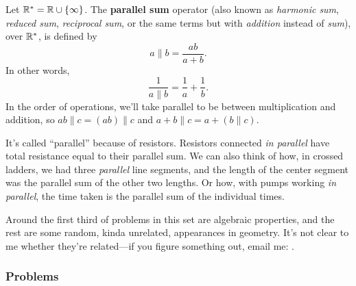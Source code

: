 \documentclass[11pt,paper=letter]{scrartcl}
\newcommand{\pl}{\parallel}
\begin{document}
Let $ \mathbb R^* = \mathbb R \cup \{\infty\} $. The \textbf{parallel sum} operator (also known as \textit{harmonic sum}, \textit{reduced sum}, \textit{reciprocal sum}, or the same terms but with \textit{addition} instead of \textit{sum}), over $\mathbb R^*$, is defined by \[
  a \pl b = \frac{ab}{a + b}.
\]
In other words, \[
  \frac{1}{a \pl b} = \frac{1}{a} + \frac{1}{b}.
\]
In the order of operations, we'll take parallel to be between multiplication and addition, so $ab \pl c = (ab) \pl c$ and $a + b \pl c = a + (b \pl c)$.

\vspace{1em}
\noindent
It's called ``parallel'' because of resistors. Resistors connected \textit{in parallel} have total resistance equal to their parallel sum. We can also think of how, in crossed ladders, we had three \textit{parallel} line segments, and the length of the center segment was the parallel sum of the other two lengths. Or how, with pumps working \textit{in parallel}, the time taken is the parallel sum of the individual times.

\vspace{1em}
\noindent
Around the first third of problems in this set are algebraic properties, and the rest are some random, kinda unrelated, appearances in geometry. It's not clear to me whether they're related---if you figure something out, email me: .

\subsubsection*{Problems}
\end{document}

